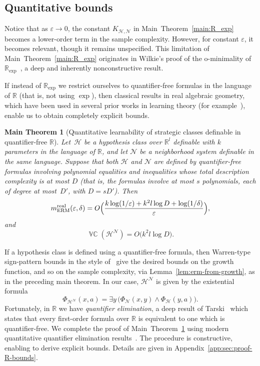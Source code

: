 \documentclass[11pt]{article}
\theoremstyle{plain}
\newtheorem{maintheorem}{Main Theorem}
\theoremstyle{definition}
\theoremstyle{remark}
\DeclareMathOperator{\VCdim}{\mathbb{VC}}
\begin{document}
\subsection{Quantitative bounds}
Notice that as $\varepsilon \to 0$, the constant $K_{\mathcal H, \mathcal N}$ in Main~Theorem~\ref{main:R_exp}
becomes a lower-order term in the sample complexity.
However, for constant $\varepsilon$, it becomes relevant, though it remains unspecified.
This limitation of Main~Theorem~\ref{main:R_exp}
originates in Wilkie's proof of the o-minimality of $\mathbb R_{\exp}$~\cite{Wilkie1996modelcompleteness}, a deep and inherently nonconstructive result. 

If instead of $\mathbb R_{\exp}$ we restrict ourselves to quantifier-free formulas in the language of $\mathbb R$ (that is, not using $\exp$), then classical results in real algebraic geometry, which have been used in several prior works in learning theory (for example~\cite{ben1993localization,Goldberg1995,Ben-DavidES02,AlonMY16,Alon23}), enable us to obtain completely explicit bounds. 

\begin{maintheorem}[Quantitative learnability of strategic classes definable in quantifier-free $\mathbb R$]
\label{main:bounds_R}
Let~$\mathcal{H}$ be a hypothesis class over $\mathbb R^l$ definable with $k$ parameters in the language of $\mathbb{R}$, and let $\mathcal N$ be a neighborhood system definable in the same language. Suppose that both $\mathcal H$ and $\mathcal N$ are defined by quantifier-free formulas involving polynomial equalities and inequalities whose \emph{total description complexity} is at most $D$ (that is, the formulas involve at most $s$ polynomials, each of degree at most~$D'$, with $D = sD'$). 
Then
\[
  m_{\mathrm{ERM}}^{\mathrm{real}}(\varepsilon,\delta)
  =
  O\Bigl(
    \frac{
      k\log(1/\varepsilon)
      + k^2 l \log D
      + \log(1/\delta)
    }{\varepsilon}
  \Bigr),
\]
and
\[
  \VCdim(\mathcal H^\mathcal N)
  =
  O\bigl(k^2 l \log D\bigr).
\]
\end{maintheorem}

If a hypothesis class is defined using a quantifier-free formula, then Warren-type sign-pattern bounds in the style of~\cite{Goldberg1995} give the desired bounds on the growth function, and so on the sample complexity, via Lemma~\ref{lem:erm-from-growth}, as in the preceding main theorem. In our case, $\mathcal H^\mathcal N$ is given by the existential formula
\[
 \Phi_{\mathcal{H}^\mathcal{N}}(x,a) = \exists y \, \bigl(\Phi_\mathcal N(x,y) \land \Phi_{\mathcal{H}}(y,a)\bigr).
\]
Fortunately, in $\mathbb R$ we have \emph{quantifier elimination}, a deep result of Tarski~\cite{tarski1951decision} which states that every first-order formula over $\mathbb R$ is equivalent to one which is quantifier-free. We complete the proof of Main~Theorem~\ref{main:bounds_R} using modern quantitative quantifier elimination results~\cite[Chapter 14]{basu2006}.
The procedure is constructive, enabling to derive explicit bounds.
Details are given in Appendix~\ref{app:sec:proof-R-bounds}.
\end{document}
